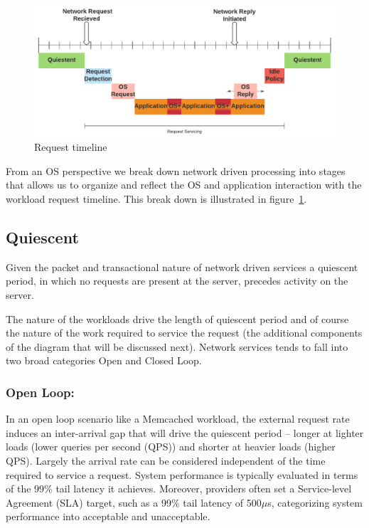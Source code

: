 
\begin{figure}
\centering
\includegraphics[width=1.1\columnwidth]{figures/timeline_chart}
\caption[]{Request timeline}
\label{fig:timeline}
\vspace{-0.28in}
\end{figure}

From an OS perspective we break down network driven processing into stages that allows us to organize and reflect the OS and application interaction with the workload request timeline.  This break down is illustrated in figure~\ref{fig:timeline}.   

\subsection{Quiescent}
\label{sec:workflow:Quiescent}
Given the packet and transactional nature of network driven services a quiescent period, in which no requests are present at the server, precedes activity on the server. 

The nature of the workloads drive the length of quiescent period and of course the nature of the work required to service the request (the additional components of the diagram that will be discussed next).  Network services tends to fall into two broad categories Open and Closed Loop.   

\subsubsection{Open Loop:}
\label{sec:workflow:openloop}
In an open loop scenario like a Memcached workload, the external request rate induces an inter-arrival gap that will drive the quiescent period -- longer at lighter loads (lower queries per second (QPS)) and shorter at heavier loads (higher QPS). Largely the arrival rate can be considered independent of the time required to service a request.  System performance is typically evaluated in terms of the 99\% tail latency it achieves.  Moreover, providers often set a Service-level Agreement (SLA) target, such as a 99\% tail latency of 500${\mu}$s, categorizing system performance into acceptable and unacceptable.  

